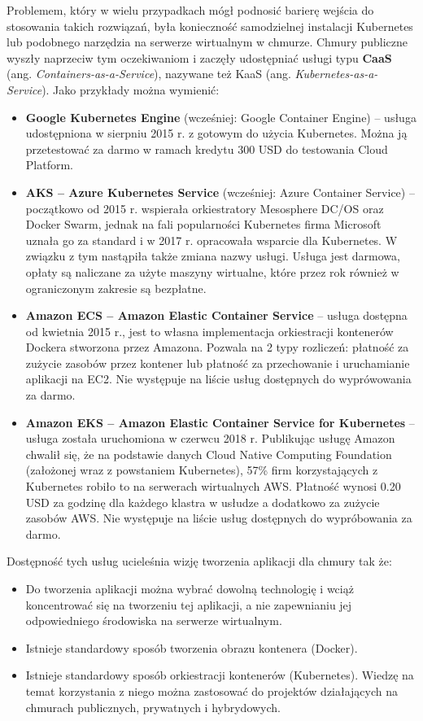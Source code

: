 \documentclass[12pt,a4paper,twoside,titlepage,openright]{book}
\begin{document}
Problemem, który w wielu przypadkach mógł podnosić barierę wejścia do stosowania takich rozwiązań, była konieczność samodzielnej instalacji Kubernetes lub podobnego narzędzia na serwerze wirtualnym w chmurze. Chmury publiczne wyszły naprzeciw tym oczekiwaniom i zaczęły udostępniać usługi typu \textbf{CaaS} (ang. \textit{Containers-as-a-Service}), nazywane też KaaS (ang. \textit{Kubernetes-as-a-Service}). Jako przykłady można wymienić:
\begin{itemize}
\item \textbf{Google Kubernetes Engine} (wcześniej: Google Container Engine) -- usługa udostępniona w sierpniu 2015 r. \cite{siteGoogleBlogKubernetes} z gotowym do użycia Kubernetes. Można ją przetestować za darmo w ramach kredytu 300 USD do testowania Cloud Platform.\cite{siteGoogleTry}
\item \textbf{AKS -- Azure Kubernetes Service} (wcześniej: Azure Container Service) -- początkowo od 2015 r. wspierała orkiestratory Mesosphere DC/OS oraz Docker Swarm, jednak na fali popularności Kubernetes firma Microsoft uznała go za standard i w 2017 r. opracowała wsparcie dla Kubernetes. W związku z tym nastąpiła także zmiana nazwy usługi. \cite{siteMicrosoftBlogAks} Usługa jest darmowa\cite{siteAksPricing}, opłaty są naliczane za użyte maszyny wirtualne, które przez rok również w ograniczonym zakresie są bezpłatne.\cite{siteAzureTry}
\item \textbf{Amazon ECS -- Amazon Elastic Container Service} -- usługa dostępna od kwietnia 2015 r., jest to własna implementacja orkiestracji kontenerów Dockera stworzona przez Amazona. Pozwala na 2 typy rozliczeń: płatność za zużycie zasobów przez kontener lub płatność za przechowanie i uruchamianie aplikacji na EC2.\cite{siteAmazonEcsPricing} Nie występuje na liście usług dostępnych do wyprówowania za darmo.\cite{siteAmazonTry}
\item \textbf{Amazon EKS -- Amazon Elastic Container Service for Kubernetes} -- usługa została uruchomiona w czerwcu 2018 r. Publikując usługę Amazon chwalił się, że na podstawie danych Cloud Native Computing Foundation (założonej wraz z powstaniem Kubernetes), 57\% firm korzystających z Kubernetes robiło to na serwerach wirtualnych AWS. Płatność wynosi 0.20 USD za godzinę dla każdego klastra w usłudze a dodatkowo za zużycie zasobów AWS.\cite{siteAmazonEksPricing} Nie występuje na liście usług dostępnych do wypróbowania za darmo.\cite{siteAmazonTry}
\end{itemize}

Dostępność tych usług ucieleśnia wizję tworzenia aplikacji dla chmury tak że:
\begin{itemize}
\item Do tworzenia aplikacji można wybrać dowolną technologię i wciąż koncentrować się na tworzeniu tej aplikacji, a nie zapewnianiu jej odpowiedniego środowiska na serwerze wirtualnym.
\item Istnieje standardowy sposób tworzenia obrazu kontenera (Docker).
\item Istnieje standardowy sposób orkiestracji kontenerów (Kubernetes). Wiedzę na temat korzystania z niego można zastosować do projektów działających na chmurach publicznych, prywatnych i hybrydowych.
\end{itemize}
\end{document}
